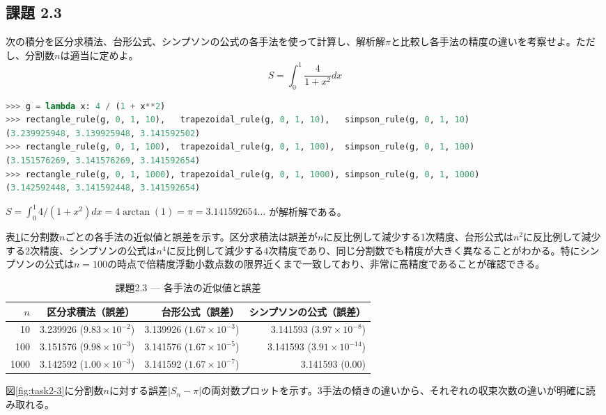 \documentclass[12pt,a4paper]{ltjsreport}
\begin{document}
\subsection*{課題 2.3}
次の積分を区分求積法、台形公式、シンプソンの公式の各手法を使って計算し、解析解$\pi$と比較し各手法の精度の違いを考察せよ。ただし、分割数$n$は適当に定めよ。
\begin{equation}
S = \int_{0}^{1}\frac{4}{1+x^2}dx
\end{equation}

\bigskip
\begin{lstlisting}[language=Python, numbers=none]
>>> g = lambda x: 4 / (1 + x**2)
>>> rectangle_rule(g, 0, 1, 10),   trapezoidal_rule(g, 0, 1, 10),   simpson_rule(g, 0, 1, 10)
(3.239925948, 3.139925948, 3.141592502)
>>> rectangle_rule(g, 0, 1, 100),  trapezoidal_rule(g, 0, 1, 100),  simpson_rule(g, 0, 1, 100)
(3.151576269, 3.141576269, 3.141592654)
>>> rectangle_rule(g, 0, 1, 1000), trapezoidal_rule(g, 0, 1, 1000), simpson_rule(g, 0, 1, 1000)
(3.142592448, 3.141592448, 3.141592654)
\end{lstlisting}
$S = \int_0^1 4/(1+x^2)dx = 4\arctan(1) = \pi = 3.141592654\ldots$ が解析解である。

表\ref{tab:task2-3}に分割数$n$ごとの各手法の近似値と誤差を示す。区分求積法は誤差が$n$に反比例して減少する1次精度、台形公式は$n^2$に反比例して減少する2次精度、シンプソンの公式は$n^4$に反比例して減少する4次精度であり、同じ分割数でも精度が大きく異なることがわかる。特にシンプソンの公式は$n=100$の時点で倍精度浮動小数点数の限界近くまで一致しており、非常に高精度であることが確認できる。

\begin{table}[H]
\centering
\caption{課題2.3 — 各手法の近似値と誤差}
\label{tab:task2-3}
\begin{tabular}{rrrr}
\toprule
$n$ & 区分求積法（誤差） & 台形公式（誤差） & シンプソンの公式（誤差） \\
\midrule
10   & 3.239926 ($9.83\times10^{-2}$) & 3.139926 ($1.67\times10^{-3}$) & 3.141593 ($3.97\times10^{-8}$) \\
100  & 3.151576 ($9.98\times10^{-3}$) & 3.141576 ($1.67\times10^{-5}$) & 3.141593 ($3.91\times10^{-14}$) \\
1000 & 3.142592 ($1.00\times10^{-3}$) & 3.141592 ($1.67\times10^{-7}$) & 3.141593 ($0.00$) \\
\bottomrule
\end{tabular}
\end{table}

図\ref{fig:task2-3}に分割数$n$に対する誤差$|S_n - \pi|$の両対数プロットを示す。3手法の傾きの違いから、それぞれの収束次数の違いが明確に読み取れる。
\end{document}
